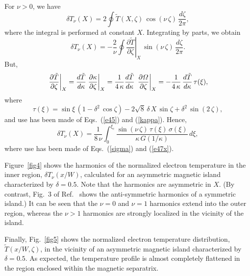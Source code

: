 \documentclass[12pt,prb,aps]{revtex4-1}
\begin{document}
For $\nu>0$, we have
\begin{equation}
\delta T_\nu(X) = 2\oint\tilde{T}(X,\zeta)\,\cos(\nu\,\zeta)\,\frac{d\zeta}{2\pi},
\end{equation}
where the integral is performed at constant $X$. 
Integrating by parts, we obtain
\begin{equation}
\delta T_\nu(X) = -\frac{2}{\nu}\oint\left.\frac{\partial \tilde{T}}{\partial\zeta}\right|_X\,\sin(\nu\,\zeta)\,\frac{d\zeta}{2\pi}.
\end{equation}
But,
\begin{equation}
\left.\frac{\partial \tilde{T}}{\partial\zeta}\right|_X=\frac{d\tilde{T}}{d\kappa}\left.\frac{\partial \kappa}{\partial\zeta}\right|_{X}
=\frac{1}{4\,\kappa}\frac{d\tilde{T}}{d\kappa}\,\left.\frac{\partial {\mit\Omega}}{\partial\zeta}\right|_{X}=-\frac{1}{4\,\kappa}\,\frac{d\tilde{T}}{d\kappa}\,\tau(\xi),
\end{equation}
where
\begin{equation}
\tau(\xi) = \sin\xi\,(1-\delta^2\,\cos\zeta)  -2\sqrt{8}\,\delta\,X\,\sin\zeta +\delta^2\,\sin(2\,\zeta),
\end{equation}
and use has been made of Eqs.~(\ref{e45}) and (\ref{kappa}). 
Hence,
\begin{equation}
\delta T_\nu(X) =\frac{1}{8\,\nu}\int_0^{\xi_c}\frac{\sin(\nu\,\zeta)\,\tau(\xi)\,\sigma(\xi)}{\kappa\,G(1/\kappa)}\,d\xi,
\end{equation}
where use has been made of Eqs.~(\ref{sigma}) and (\ref{e47x}).

Figure~\ref{fig4} shows the harmonics of the normalized electron temperature  in the inner region, $\delta T_\nu(x/W)$, calculated for an asymmetric
magnetic island characterized by $\delta=0.5$.  Note that the harmonics are asymmetric in $X$. (By contrast, Fig.~3 of Ref.~ shows
the anti-symmetric harmonics of a symmetric island.) It can be seen that the $\nu=0$ and $\nu=1$ harmonics extend into the outer region, whereas the
$\nu>1$ harmonics are strongly localized in the vicinity of the island. 

Finally, Fig.~\ref{fig5} shows the normalized electron temperature distribution, $\tilde{T}(x/W,\zeta)$, in the vicinity of an asymmetric magnetic island  characterized by
$\delta = 0.5$. As expected, the temperature profile is almost completely flattened in the region enclosed  within the magnetic separatrix. 
\end{document}
